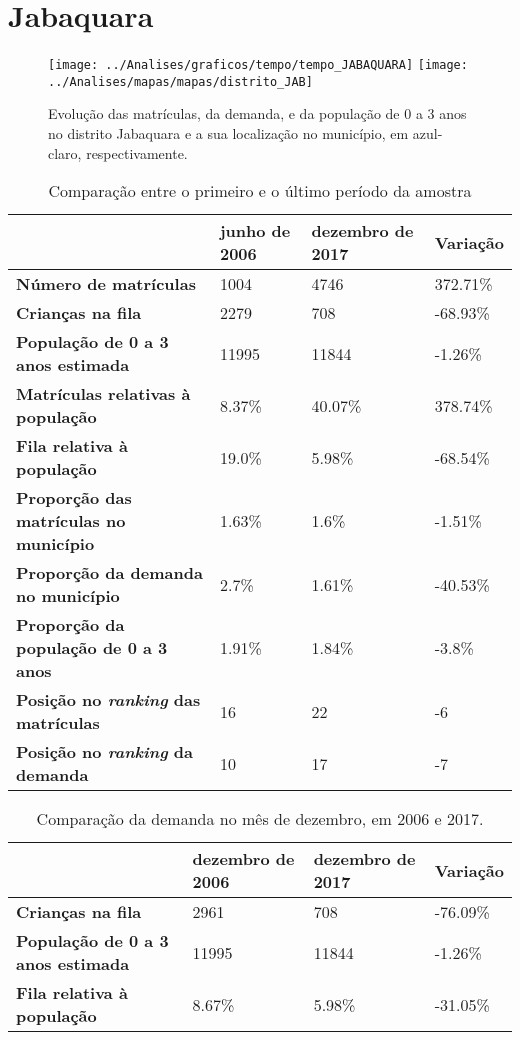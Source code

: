 \section{Jabaquara}
\begin{figure}[H]
\centering
\texttt{[image: ../Analises/graficos/tempo/tempo\_JABAQUARA]}
\texttt{[image: ../Analises/mapas/mapas/distrito\_JAB]}
\caption{Evolução das matrículas, da demanda, e da população de 0 a 3 anos no distrito Jabaquara e a sua localização no município, em azul-claro, respectivamente.}
\end{figure}
\begin{table}[H]
\begin{tabular}{l|l|l|l}
\textbf{}                                      & \textbf{junho de 2006}       & \textbf{dezembro de 2017}    & \textbf{Variação} \\ \hline
\textbf{Número de matrículas}                  & 1004 & 4746 & 372.71\% \\ \hline
\textbf{Crianças na fila}                      & 2279 & 708 & -68.93\% \\ \hline
\textbf{População de 0 a 3 anos estimada}      & 11995 & 11844 & -1.26\% \\ \hline
\textbf{Matrículas relativas à população}      & 8.37\% & 40.07\% & 378.74\% \\ \hline
\textbf{Fila relativa à população}             & 19.0\% & 5.98\% & -68.54\% \\ \hline
\textbf{Proporção das matrículas no município} & 1.63\% & 1.6\% & -1.51\% \\ \hline
\textbf{Proporção da demanda no município}     & 2.7\% & 1.61\% & -40.53\% \\ \hline
\textbf{Proporção da população de 0 a 3 anos}  & 1.91\% & 1.84\% & -3.8\% \\ \hline
\textbf{Posição no \textit{ranking} das matrículas}     & 16 & 22 & -6 \\ \hline
\textbf{Posição no \textit{ranking} da demanda}         & 10 & 17 & -7 \\ 
\end{tabular}
\caption{Comparação entre o primeiro e o último período da amostra}
\end{table}
\begin{table}[H]
\begin{tabular}{l|l|l|l}
\textbf{}                                 & \textbf{dezembro de 2006} & \textbf{dezembro de 2017} & \textbf{Variação} \\ \hline
\textbf{Crianças na fila}                      & 2961 & 708 & -76.09\% \\ \hline
\textbf{População de 0 a 3 anos estimada}      & 11995 & 11844 & -1.26\% \\ \hline
\textbf{Fila relativa à população}             & 8.67\% & 5.98\% & -31.05\% \\
\end{tabular}
\caption{Comparação da demanda no mês de dezembro, em 2006 e 2017.}
\end{table}
